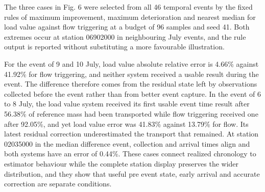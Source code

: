 \documentclass[lineno,pdflatex,sn-apa]{sn-jnl}%
\theoremstyle{thmstyleone}%
\theoremstyle{thmstyletwo}%
\theoremstyle{thmstylethree}%
\begin{document}
The three cases in Fig. 6 were selected from all 46 temporal events by the fixed rules of maximum improvement, maximum deterioration and nearest median for load value against flow triggering at a budget of 96 samples and seed 41. Both extremes occur at station 06902000 in neighbouring July events, and the rule output is reported without substituting a more favourable illustration.

For the event of 9 and 10 July, load value absolute relative error is 4.66\% against 41.92\% for flow triggering, and neither system received a usable result during the event. The difference therefore comes from the residual state left by observations collected before the event rather than from better event capture. In the event of 6 to 8 July, the load value system received its first usable event time result after 56.38\% of reference mass had been transported while flow triggering received one after 92.05\%, and yet load value error was 41.83\% against 13.79\% for flow. Its latest residual correction underestimated the transport that remained. At station 02035000 in the median difference event, collection and arrival times align and both systems have an error of 0.44\%. These cases connect realized chronology to estimator behaviour while the complete station display preserves the wider distribution, and they show that useful pre event state, early arrival and accurate correction are separate conditions.
\end{document}
